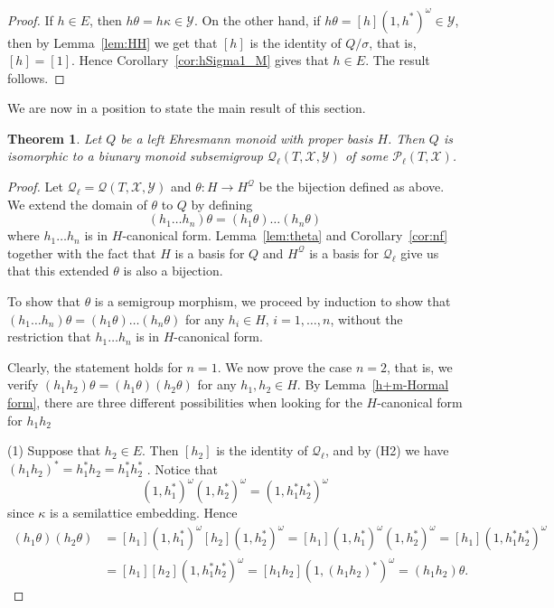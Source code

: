 \documentclass[12pt]{amsart}
\newtheorem{them}{Theorem}[section]
\theoremstyle{definition}
\theoremstyle{definition}
\numberwithin{them}{section}
\numberwithin{equation}{section}
\newcommand{\QQ}{\mbox{$\mathcal{Q}_\ell$}}
\newcommand{\X}{\mathcal{X}}
\newcommand{\Y}{\mathcal{Y}}
\begin{document}
{{\begin{proof}
 If $h\in E$, then $h\theta=h\kappa\in \Y$. On the other hand, if $h\theta=[h](1,h^*)^\omega\in \Y$, then by Lemma~\ref{lem:HH} we get that $[h]$ is the  identity of $Q/\sigma$, that is, $[h]=[1]$. Hence  
 Corollary~\ref{cor:hSigma1_M} gives that $h\in E$. The result follows.
    \end{proof}


 We are now in a position to state the main result of this section.

\begin{them}\label{them:main}   Let $Q$
be a left Ehresmann monoid with proper  basis $H$. Then $Q$ is isomorphic to  a  biunary monoid subsemigroup  $\QQ(T,\X,\Y)$ of some $\mathcal{P}_{\ell}(T,\X)$. 

\end{them}

\begin{proof} Let  $\QQ=\mathcal{Q}(T, \X , \Y)$ and $\theta:H\rightarrow H^{\mathcal{Q}}$ be the bijection defined as above. We extend the domain of $\theta$ to $Q$ by  defining 
\[(h_1\dots h_n)\theta=(h_1\theta)\dots (h_n\theta)\]
where $h_1\dots h_n$ is in $H$-canonical form. Lemma~\ref{lem:theta}  and Corollary~\ref{cor:nf} together with the fact that $H$ is a basis for $Q$ and $H^{\mathcal{Q}}$ is a basis for $\QQ$ give  us that this extended $\theta$ is also a bijection.



To show that $\theta$ is a  semigroup morphism, we proceed by induction to show  that $(h_1\dots h_n)\theta=(h_1\theta)\dots (h_n\theta)$ for any $h_i \in H$, $i = 1, \dots, n$, without the restriction that $h_1\dots h_n$ is in $H$-canonical form.

  Clearly, the statement  holds for $n =1$.  We now prove the case $n=2$, that is, we verify $(h_1h_2)\theta = (h_1\theta)( h_2\theta)$ for any $h_1,h_2\in H$.  By Lemma~\ref{h+m-Hormal form}, there are three  different possibilities when looking for the $H$-canonical form for $h_1h_2$

  (1) Suppose that $h_2\in E$. Then $[h_2]$ is the identity of $\QQ$,  and  by (H2)
we have $(h_1h_2)^* = h_1^*h_2= h_1^* h_2^*$ . Notice that  $$(1, h_1^*)^\omega(1, h_2^*)^\omega =(1, h_1^*h_2^*)^\omega$$ 
since $\kappa$ is a semilattice embedding. 
Hence
\[
\begin{aligned}
(h_1\theta)( h_2\theta) &= [h_1](1, h_1^*)^\omega[h_2](1, h_2^*)^\omega=[h_1](1, h_1^*)^\omega(1, h_2^*)^\omega=[h_1](1, h_1^*h_2^*)^\omega\\
        &=[h_1][h_2](1, h_1^*h_2^*)^\omega=[h_1h_2](1,(h_1h_2)^*)^\omega=(h_1h_2)\theta.\
\end{aligned}
\]



\end{proof}}}
\end{document}
